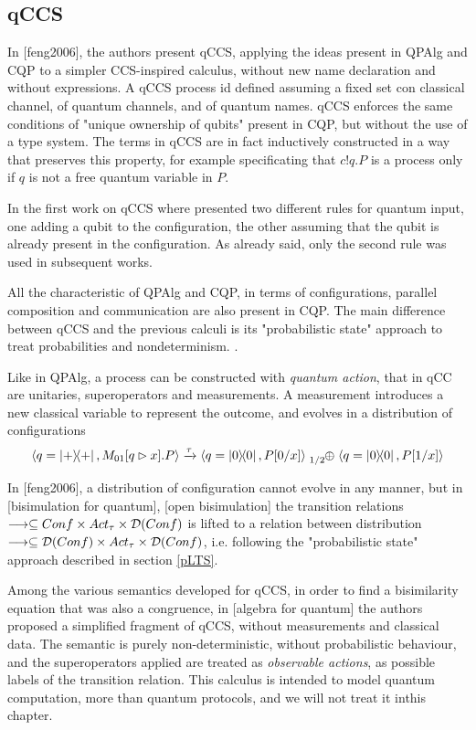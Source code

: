 
\subsection{qCCS}

In [feng2006], the authors present qCCS, applying the ideas present in QPAlg and CQP to a simpler CCS-inspired calculus, without new name declaration and without expressions. A qCCS process id defined assuming a fixed set con classical channel, of quantum channels, and of quantum names. qCCS enforces the same conditions of "unique ownership of qubits" present in CQP, but without the use of a type system. The terms in qCCS are in fact inductively constructed in a way that preserves this property, for example specificating that $c!q.P$ is a process only if $q$ is not a free quantum variable in $P$.


In the first work on qCCS where presented two different rules for quantum input, one adding a qubit to the configuration, the other assuming that the qubit is already present in the configuration. As already said, only the second rule was used in subsequent works.


All the characteristic of QPAlg and CQP, in terms of configurations, parallel composition and communication are also present in CQP. The main difference between qCCS and the previous calculi is its "probabilistic state" approach to treat probabilities and nondeterminism. .


Like in QPAlg, a process can be constructed with \textit{quantum action}, that in qCC  are unitaries, superoperators and measurements. A measurement introduces a new classical variable to represent the outcome, and evolves in a distribution of configurations
\[ \confw{q = \proj{+}, M_{01}[q \rhd x].P} \xrightarrow{\tau} \confw{q = \proj{0}, P[0/x]} \psum{1/2} \confw{q = \proj{0}, P[1/x]} 
\]

In [feng2006], a distribution of configuration cannot evolve in any manner, but in [bisimulation for quantum], [open bisimulation] the transition relations $\longrightarrow \subseteq Conf \times Act_\tau \times \mathcal{D}(Conf)$ is lifted to a relation between distribution $\longrightarrow \subseteq \mathcal{D}(Conf) \times Act_\tau \times \mathcal{D}(Conf)$, i.e. following the "probabilistic state" approach described in section \ref{pLTS}.


Among the various semantics developed for qCCS, in order to find a bisimilarity equation that was also a congruence, in [algebra for quantum] the authors proposed a simplified fragment of qCCS, without measurements and classical data. The semantic is purely non-deterministic, without probabilistic behaviour, and the superoperators applied are treated as \textit{observable actions}, as possible labels of the transition relation. This calculus is intended to model quantum computation, more than quantum protocols, and we will not treat it inthis chapter.


